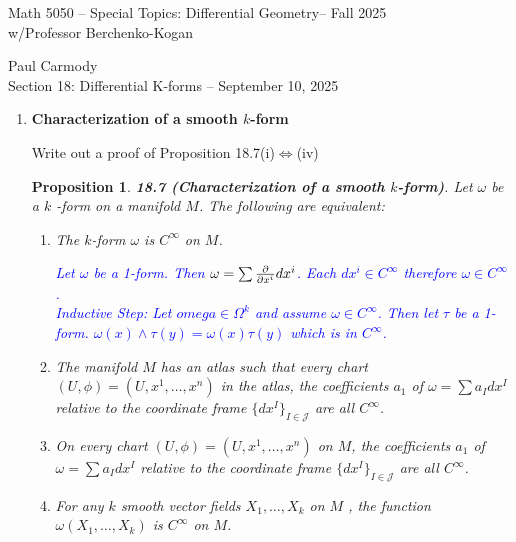 \documentclass[12pt,a4paper]{report}
\newcommand{\CLASSNAME}{Math 5050 -- Special Topics: Differential Geometry}
\newcommand{\STUDENTNAME}{Paul Carmody}
\newcommand{\ASSIGNMENT}{Section 18: Differential K-forms }
\newcommand{\DUEDATE}{September 10, 2025}
\newcommand{\PROFESSOR}{Professor Berchenko-Kogan}
\newcommand{\SEMESTER}{Fall 2025}
\newcommand{\BLUE}[1]{\textcolor{blue}{#1}}
\begin{document}
\begin{center}
	\Large{\CLASSNAME -- \SEMESTER} \\
	\large{ w/\PROFESSOR}
\end{center}
\begin{center}
	\STUDENTNAME \\
	\ASSIGNMENT -- \DUEDATE\\
\end{center} 


\begin{enumerate}[label=18.\arabic*]

\item \textbf{Characterization of a smooth $k$-form}

	Write out a proof of Proposition 18.7(i)$\iff$(iv)
	\newtheorem*{propp}{\textbf{Proposition}}

\begin{propp}	\textbf{18.7 (Characterization of a smooth $k$-form)}.  Let $\omega$ be a $k$ -form on a manifold $M$.  The following are equivalent:
\begin{enumerate}[label=(\roman*)]

	\item The $k$-form $\omega$ is $C^\infty$ on $M$.
	
	\BLUE{Let $\omega$ be a 1-form.  Then $\omega = \sum \frac{\partial }{\partial x^i}dx^i$.  Each $dx^i \in C^\infty$ therefore $\omega \in C^\infty$.\\
	Inductive Step: Let $omega \in \Omega^k$ and assume $\omega \in C^\infty$. Then let $\tau$ be a 1-form.  $\omega(x)\wedge\tau(y) = \omega(x)\tau(y)$ which is in $C^\infty$.
	}
	
	\item The manifold $M$ has an atlas such that every chart $(U,\phi) = (U, x^1,\dots, x^n)$ in the atlas, the coefficients $a_1$ of $\omega=\sum a_Idx^I$ relative to the coordinate frame $\{dx^I\}_{I\in \mathcal{J}}$ are all $C^\infty$.
	
	\item On every chart $(U,\phi) = (U,x^1,\dots,x^n)$ on $M$, the coefficients $a_1$ of $\omega=\sum a_Idx^I$ relative to the coordinate frame $\{dx^I\}_{I\in \mathcal{J}}$ are all $C^\infty$.
	
	\item For any $k$ smooth vector fields $X_1,\dots, X_k$ on $M$ , the function $\omega(X_1,\dots, X_k)$ is $C^\infty$ on $M$.

\end{enumerate}\HLINE


\end{propp}
\end{enumerate}
\end{document}
